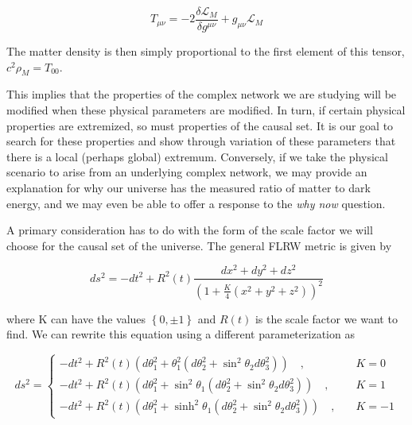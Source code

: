 \documentclass[preprint,notitlepage,amsmath,amssymb,floatfix]{revtex4-1}
\begin{document}
\begin{equation}
\label{eq:EL_stress_energy}
T_{\mu\nu} = -2\frac{\delta\mathcal{L}_M}{\delta g^{\mu\nu}} + g_{\mu\nu}\mathcal{L}_M
\end{equation}

\noindent The matter density is then simply proportional to the first element of this tensor, $c^2\rho_M = T_{00}$. \par
This implies that the properties of the complex network we are studying will be modified when these physical parameters are modified.
In turn, if certain physical properties are extremized, so must properties of the causal set.
It is our goal to search for these properties and show through variation of these parameters that there is a local (perhaps global) extremum.
Conversely, if we take the physical scenario to arise from an underlying complex network, we may provide an explanation for why our universe has the measured ratio of matter to dark energy, and we may even be able to offer a response to the \textit{why now} question. \par
A primary consideration has to do with the form of the scale factor we will choose for the causal set of the universe.  The general FLRW metric is given by

\begin{equation}
ds^2 = -dt^2 + R^2\left(t\right)\frac{dx^2 + dy^2 + dz^2}{\left(1 + \frac{K}{4}\left(x^2+y^2+z^2\right)\right)^2}
\end{equation}

\noindent where K can have the values $\left\{0, \pm 1\right\}$ and $R\left(t\right)$ is the scale factor we want to find.  We can rewrite this equation using a different parameterization as

\begin{equation}\label{ds^2}
ds^2 = 
\begin{cases}
-dt^2 + R^2\left(t\right)\left(d\theta_1^2 + \theta_1^2\left(d\theta_2^2+\sin^2\theta_2 d\theta_3^2\right)\right)\quad, & \quad K = 0 \\
-dt^2 + R^2\left(t\right)\left(d\theta_1^2 + \sin^2\theta_1\left(d\theta_2^2 + \sin^2\theta_2 d\theta_3^2\right)\right)\quad, & \quad K = 1 \\
-dt^2 + R^2\left(t\right)\left(d\theta_1^2 + \sinh^2\theta_1\left(d\theta_2^2 + \sin^2\theta_2 d\theta_3^2\right)\right)\quad, & \quad K = -1
\end{cases}
\end{equation}
\end{document}
